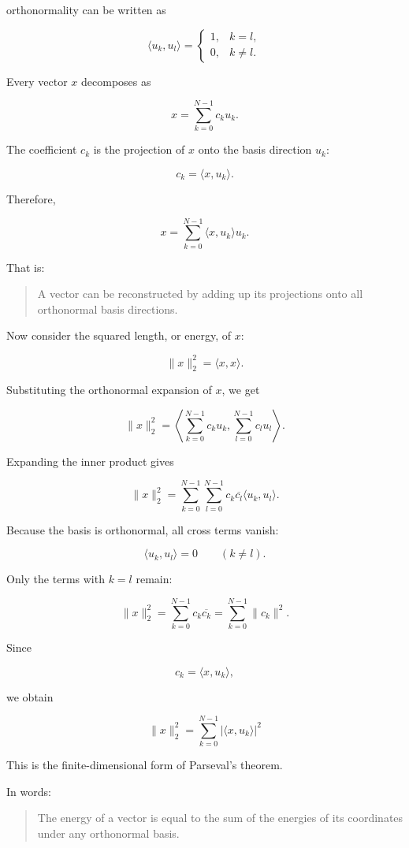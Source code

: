 orthonormality can be written as

\[
\langle u_k,u_l\rangle
=
\begin{cases}
1, & k=l,\\
0, & k\ne l.
\end{cases}
\]

Every vector \(x\) decomposes as

\[
x
=
\sum_{k=0}^{N-1}
c_k u_k.
\]

The coefficient \(c_k\) is the projection of \(x\) onto the basis direction \(u_k\):

\[
c_k
=
\langle x,u_k\rangle.
\]

Therefore,

\[
x
=
\sum_{k=0}^{N-1}
\langle x,u_k\rangle u_k.
\]

That is:

\begin{quote}
A vector can be reconstructed by adding up its projections onto all orthonormal basis directions.
\end{quote}

Now consider the squared length, or energy, of \(x\):

\[
\|x\|_2^2
=
\langle x,x\rangle.
\]

Substituting the orthonormal expansion of \(x\), we get

\[
\|x\|_2^2
=
\left\langle
\sum_{k=0}^{N-1} c_k u_k,
\sum_{l=0}^{N-1} c_l u_l
\right\rangle.
\]

Expanding the inner product gives

\[
\|x\|_2^2
=
\sum_{k=0}^{N-1}
\sum_{l=0}^{N-1}
c_k \overline{c_l}
\langle u_k,u_l\rangle.
\]

Because the basis is orthonormal, all cross terms vanish:

\[
\langle u_k,u_l\rangle=0
\qquad
(k\ne l).
\]

Only the terms with \(k=l\) remain:

\[
\|x\|_2^2
=
\sum_{k=0}^{N-1}
c_k \overline{c_k}
=
\sum_{k=0}^{N-1}
\|c_k\|^2.
\]

Since

\[
c_k=\langle x,u_k\rangle,
\]

we obtain

\[
\boxed{
\|x\|_2^2
=
\sum_{k=0}^{N-1}
|\langle x,u_k\rangle|^2
}
\]

This is the finite-dimensional form of Parseval’s theorem.

In words:

\begin{quote}
The energy of a vector is equal to the sum of the energies of its coordinates under any orthonormal basis.
\end{quote}

